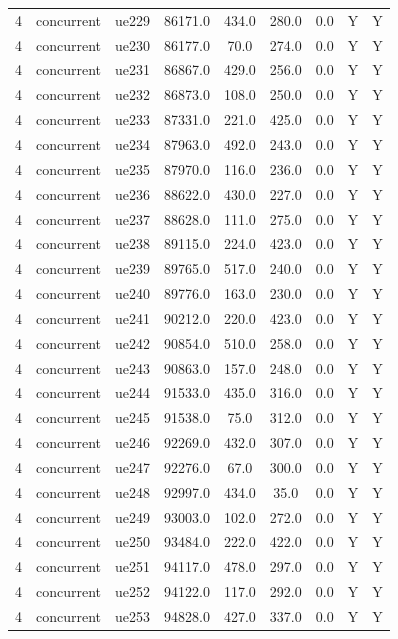 \begin{table}[ht]
\begin{tabular}{|c|c|c|c|c|c|c|c|c|}
4 & concurrent & ue229 & 86171.0 & 434.0 & 280.0 & 0.0 & Y & Y \\
4 & concurrent & ue230 & 86177.0 & 70.0 & 274.0 & 0.0 & Y & Y \\
4 & concurrent & ue231 & 86867.0 & 429.0 & 256.0 & 0.0 & Y & Y \\
4 & concurrent & ue232 & 86873.0 & 108.0 & 250.0 & 0.0 & Y & Y \\
4 & concurrent & ue233 & 87331.0 & 221.0 & 425.0 & 0.0 & Y & Y \\
4 & concurrent & ue234 & 87963.0 & 492.0 & 243.0 & 0.0 & Y & Y \\
4 & concurrent & ue235 & 87970.0 & 116.0 & 236.0 & 0.0 & Y & Y \\
4 & concurrent & ue236 & 88622.0 & 430.0 & 227.0 & 0.0 & Y & Y \\
4 & concurrent & ue237 & 88628.0 & 111.0 & 275.0 & 0.0 & Y & Y \\
4 & concurrent & ue238 & 89115.0 & 224.0 & 423.0 & 0.0 & Y & Y \\
4 & concurrent & ue239 & 89765.0 & 517.0 & 240.0 & 0.0 & Y & Y \\
4 & concurrent & ue240 & 89776.0 & 163.0 & 230.0 & 0.0 & Y & Y \\
4 & concurrent & ue241 & 90212.0 & 220.0 & 423.0 & 0.0 & Y & Y \\
4 & concurrent & ue242 & 90854.0 & 510.0 & 258.0 & 0.0 & Y & Y \\
4 & concurrent & ue243 & 90863.0 & 157.0 & 248.0 & 0.0 & Y & Y \\
4 & concurrent & ue244 & 91533.0 & 435.0 & 316.0 & 0.0 & Y & Y \\
4 & concurrent & ue245 & 91538.0 & 75.0 & 312.0 & 0.0 & Y & Y \\
4 & concurrent & ue246 & 92269.0 & 432.0 & 307.0 & 0.0 & Y & Y \\
4 & concurrent & ue247 & 92276.0 & 67.0 & 300.0 & 0.0 & Y & Y \\
4 & concurrent & ue248 & 92997.0 & 434.0 & 35.0 & 0.0 & Y & Y \\
4 & concurrent & ue249 & 93003.0 & 102.0 & 272.0 & 0.0 & Y & Y \\
4 & concurrent & ue250 & 93484.0 & 222.0 & 422.0 & 0.0 & Y & Y \\
4 & concurrent & ue251 & 94117.0 & 478.0 & 297.0 & 0.0 & Y & Y \\
4 & concurrent & ue252 & 94122.0 & 117.0 & 292.0 & 0.0 & Y & Y \\
4 & concurrent & ue253 & 94828.0 & 427.0 & 337.0 & 0.0 & Y & Y \\

\end{tabular}
\end{table}
